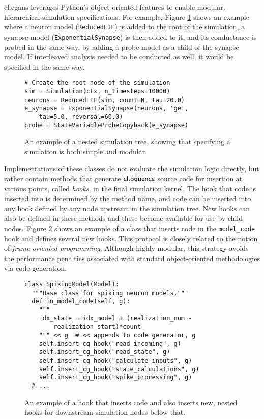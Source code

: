 \documentclass{llncs}
\begin{document}
{\sf cl.egans} leverages Python's object-oriented features to enable modular, hierarchical simulation specifications. For example, Figure \ref{spec} shows an example where a neuron model (\verb|ReducedLIF|) is added to the root of the simulation, a synapse model (\verb|ExponentialSynapse|) is then added to it, and its conductance is probed in the same way, by adding a probe model as a child of the synapse model. If interleaved analysis needed to be conducted as well, it would be specified in the same way.
\begin{figure}
\small{
\begin{verbatim}
# Create the root node of the simulation
sim = Simulation(ctx, n_timesteps=10000)
neurons = ReducedLIF(sim, count=N, tau=20.0)
e_synapse = ExponentialSynapse(neurons, 'ge',
    tau=5.0, reversal=60.0)
probe = StateVariableProbeCopyback(e_synapse)
\end{verbatim}}
\caption{An example of a nested simulation tree, showing that specifying a simulation is both simple and modular.}
\label{spec}
\end{figure}


Implementations of these classes do not evaluate the simulation logic directly, but rather contain methods that generate $\textsf{cl.oquence}$ source code for insertion at various points, called {\it hooks}, in the final simulation kernel. The hook that code is inserted into is determined by the method name, and code can be inserted into any hook defined by any node upstream in the simulation tree. New hooks can also be defined in these methods and these become available for use by child nodes. Figure \ref{impl} shows an example of a class that inserts code in the \verb|model_code| hook and defines several new hooks. This protocol is closely related to the notion of {\it frame-oriented programming}. Although highly modular, this strategy avoids the performance penalties associated with standard object-oriented methodologies via code generation.

\begin{figure}\small{
\begin{verbatim}
class SpikingModel(Model):
  """Base class for spiking neuron models."""
  def in_model_code(self, g):
    """
    idx_state = idx_model + (realization_num - 
        realization_start)*count
    """ << g  # << appends to code generator, g
    self.insert_cg_hook("read_incoming", g)
    self.insert_cg_hook("read_state", g)
    self.insert_cg_hook("calculate_inputs", g)
    self.insert_cg_hook("state_calculations", g)
    self.insert_cg_hook("spike_processing", g)
  # ...
\end{verbatim}}
\caption{An example of a hook that inserts code and also inserts new, nested hooks for downstream simulation nodes  below that.}
\label{impl}
\end{figure}
\end{document}
